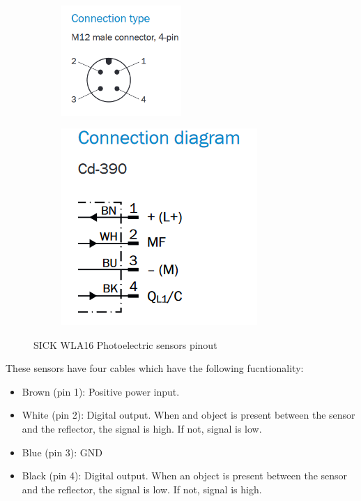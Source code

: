 \documentclass[a4paper]{article}
\begin{document}
\begin{figure}[h!]
	\begin{subfigure}{.5\textwidth}
		\centering
		\includegraphics[width=0.5\textwidth]{SICKpins1.png}
		\label{fig:SICKpins2}
	\end{subfigure}%
	\begin{subfigure}{.5\textwidth}
		\centering
		\includegraphics[width=.5\linewidth]{SICKpins2.png}
		\label{fig:SICKpins2}
	\end{subfigure}
	\caption{SICK WLA16 Photoelectric sensors pinout}
	\label{fig:SICKpins}
\end{figure} 

These sensors have four cables which have the following fucntionality:
\begin{itemize}
	\item Brown (pin 1): Positive power input.
	\item White (pin 2): Digital output. When and object is present between the sensor and the reflector, the signal is high. If not, signal is low.
	\item Blue (pin 3): GND 	
	\item Black (pin 4): Digital output. When an object is present between the sensor and the reflector, the signal is low. If not, signal is high.
\end{itemize}
\end{document}
